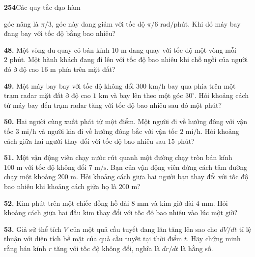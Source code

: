 {\noindent\bfseries 254}\hspace{2.5em}{\bfseries CHƯƠNG 3}\hspace{1.2em}Các quy tắc đạo hàm
\par\vspace{10pt}

\noindent
\begin{minipage}[t]{0.485\textwidth}
  \fontsize{8.8pt}{11.5pt}\selectfont
  góc nâng là $\pi/3$, góc này đang giảm với tốc độ $\pi/6\text{ rad/phút}$. Khi đó máy bay đang bay với tốc độ bằng bao nhiêu?\par\vspace{8pt}
  
  \textbf{48.} Một vòng đu quay có bán kính $10\text{ m}$ đang quay với tốc độ một vòng mỗi $2\text{ phút}$. Một hành khách đang đi lên với tốc độ bao nhiêu khi chỗ ngồi của người đó ở độ cao $16\text{ m}$ phía trên mặt đất?\par\vspace{8pt}
  
  \textbf{49.} Một máy bay bay với tốc độ không đổi $300\text{ km/h}$ bay qua phía trên một trạm radar mặt đất ở độ cao $1\text{ km}$ và bay lên theo một góc $30^\circ$. Hỏi khoảng cách từ máy bay đến trạm radar tăng với tốc độ bao nhiêu sau đó một phút?\par\vspace{8pt}
  
  \textbf{50.} Hai người cùng xuất phát từ một điểm. Một người đi về hướng đông với vận tốc $3\text{ mi/h}$ và người kia đi về hướng đông bắc với vận tốc $2\text{ mi/h}$. Hỏi khoảng cách giữa hai người thay đổi với tốc độ bao nhiêu sau $15\text{ phút}$?
\end{minipage}\hfill
\begin{minipage}[t]{0.485\textwidth}
  \fontsize{8.8pt}{11.5pt}\selectfont
  \textbf{51.} Một vận động viên chạy nước rút quanh một đường chạy tròn bán kính $100\text{ m}$ với tốc độ không đổi $7\text{ m/s}$. Bạn của vận động viên đứng cách tâm đường chạy một khoảng $200\text{ m}$. Hỏi khoảng cách giữa hai người bạn thay đổi với tốc độ bao nhiêu khi khoảng cách giữa họ là $200\text{ m}$?\par\vspace{8pt}
  
  \textbf{52.} Kim phút trên một chiếc đồng hồ dài $8\text{ mm}$ và kim giờ dài $4\text{ mm}$. Hỏi khoảng cách giữa hai đầu kim thay đổi với tốc độ bao nhiêu vào lúc một giờ?\par\vspace{8pt}
  
  \textbf{53.} Giả sử thể tích $V$ của một quả cầu tuyết đang lăn tăng lên sao cho $dV/dt$ tỉ lệ thuận với diện tích bề mặt của quả cầu tuyết tại thời điểm $t$. Hãy chứng minh rằng bán kính $r$ tăng với tốc độ không đổi, nghĩa là $dr/dt$ là hằng số.
\end{minipage}

